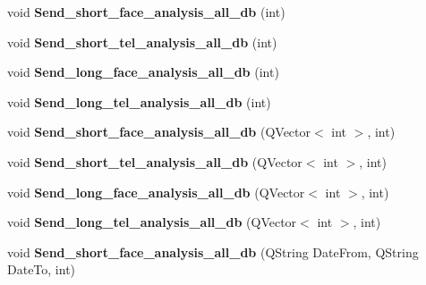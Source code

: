 \begin{DoxyCompactItemize}
\item 
\mbox{\label{class_analysis_aeca321e82b4d09e9e260c359daad1d6b}} 
void {\bfseries Send\+\_\+short\+\_\+face\+\_\+analysis\+\_\+all\+\_\+db} (int)
\item 
\mbox{\label{class_analysis_aa4375acfc726e92cf8b75d3ff4a4777a}} 
void {\bfseries Send\+\_\+short\+\_\+tel\+\_\+analysis\+\_\+all\+\_\+db} (int)
\item 
\mbox{\label{class_analysis_ac9e74c6b44a7cd3c310351516271a979}} 
void {\bfseries Send\+\_\+long\+\_\+face\+\_\+analysis\+\_\+all\+\_\+db} (int)
\item 
\mbox{\label{class_analysis_a3a529c301a9fec5fd5cc2a752df15db8}} 
void {\bfseries Send\+\_\+long\+\_\+tel\+\_\+analysis\+\_\+all\+\_\+db} (int)
\item 
\mbox{\label{class_analysis_ac44348618603bbb41ade614b0b6b7500}} 
void {\bfseries Send\+\_\+short\+\_\+face\+\_\+analysis\+\_\+all\+\_\+db} (Q\+Vector$<$ int $>$, int)
\item 
\mbox{\label{class_analysis_a730a81d4af7fbf4e6f9c34d00041251c}} 
void {\bfseries Send\+\_\+short\+\_\+tel\+\_\+analysis\+\_\+all\+\_\+db} (Q\+Vector$<$ int $>$, int)
\item 
\mbox{\label{class_analysis_a6596eb699e53894c067f11a6b7580809}} 
void {\bfseries Send\+\_\+long\+\_\+face\+\_\+analysis\+\_\+all\+\_\+db} (Q\+Vector$<$ int $>$, int)
\item 
\mbox{\label{class_analysis_ad5e6059bc59853cb820babe2ef835f2f}} 
void {\bfseries Send\+\_\+long\+\_\+tel\+\_\+analysis\+\_\+all\+\_\+db} (Q\+Vector$<$ int $>$, int)
\item 
\mbox{\label{class_analysis_a5b544fafcce35f05fd8957daa042fbc5}} 
void {\bfseries Send\+\_\+short\+\_\+face\+\_\+analysis\+\_\+all\+\_\+db} (Q\+String Date\+From, Q\+String Date\+To, int)
\item 
\mbox{\label{class_analysis_ae221006fc928694a76f2962490cf7851}} 

\end{DoxyCompactItemize}

